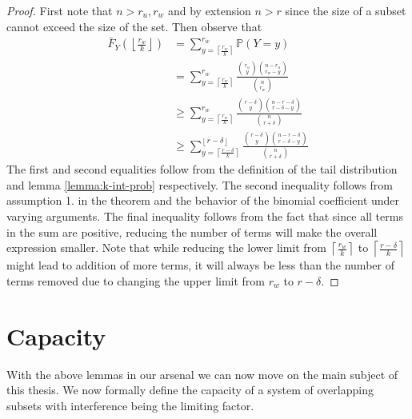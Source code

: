     \begin{proof}  
        First note that $n > r_u, r_w$ and by extension $n > r$ since the size of a subset cannot exceed the size of the set.  
        Then observe that 
        \begin{equation}
            \begin{split}
                \bar{F}_Y\left(\left\lfloor \frac{r_w}{k} \right\rfloor\right)  
                &=
                 \sum_{y = \left\lceil \frac{r_w}{k} \right\rceil}^{r_w} \mathbb{P}(Y=y)  
                \\[2em] &=    \sum_{y = \left\lceil \frac{r_w}{k} \right\rceil}^{r_w} \frac{\binom{r_u}{y} \binom{n-r_u}{r_w-y}}{\binom{n}{r_w}} 
                \\[2em] &\ge  \sum_{y = \left\lceil \frac{r_w}{k} \right\rceil}^{r_w} \frac{\binom{r-\delta}{y} \binom{n-r-\delta}{r-\delta-y}}{\binom{n}{r+\delta}}  
                \\[2em] &\ge  \sum_{y = \left\lceil \frac{r-\delta}{k} \right\rceil}^{\left\lfloor r - \delta \right\rfloor} \frac{\binom{r-\delta}{y} \binom{n-r-\delta}{r-\delta-y}}{\binom{n}{r+\delta}}  
            \end{split}
        \end{equation}
        The first and second equalities follow from the definition of the tail distribution and lemma \ref{lemma:k-int-prob} respectively. The second inequality follows from assumption 1. in the theorem and the behavior of the binomial coefficient under varying arguments. The final inequality follows from the fact that since all terms in the sum are positive, reducing the number of terms will make the overall expression smaller. Note that while reducing the lower limit from $\left\lceil \frac{r_w}{k} \right\rceil$ to $\left\lceil \frac{r-\delta}{k} \right\rceil$ might lead to addition of more terms, it will always be less than the number of terms removed due to changing the upper limit from $r_w$ to $r-\delta$.
        
    \end{proof}

    \section{Capacity}
    With the above lemmas in our arsenal we can now move on  the main subject of this thesis. We now formally define the capacity of a system of overlapping subsets with interference being the limiting factor. 

